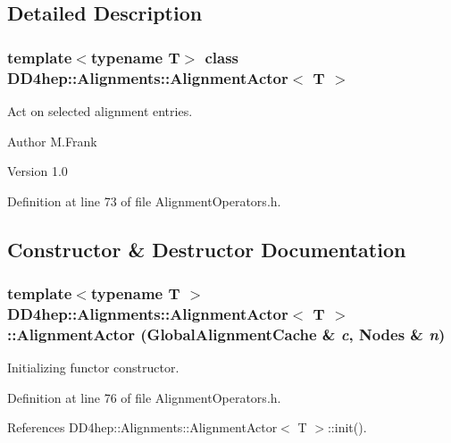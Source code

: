 \subsection{Detailed Description}
\subsubsection*{template$<$typename T$>$ class DD4hep::Alignments::AlignmentActor$<$ T $>$}

Act on selected alignment entries. \begin{DoxyAuthor}{Author}
M.Frank 
\end{DoxyAuthor}
\begin{DoxyVersion}{Version}
1.0 
\end{DoxyVersion}


Definition at line 73 of file AlignmentOperators.h.

\subsection{Constructor \& Destructor Documentation}
\hypertarget{class_d_d4hep_1_1_alignments_1_1_alignment_actor_a4442541ec4416c08e7a36c7b5eaacbfb}{
\subsubsection[{AlignmentActor}]{\setlength{\rightskip}{0pt plus 5cm}template$<$typename T $>$ {\bf DD4hep::Alignments::AlignmentActor}$<$ {\bf T} $>$::{\bf AlignmentActor} ({\bf GlobalAlignmentCache} \& {\em c}, \/  {\bf Nodes} \& {\em n})}}
\label{class_d_d4hep_1_1_alignments_1_1_alignment_actor_a4442541ec4416c08e7a36c7b5eaacbfb}


Initializing functor constructor. 

Definition at line 76 of file AlignmentOperators.h.

References DD4hep::Alignments::AlignmentActor$<$ T $>$::init().

